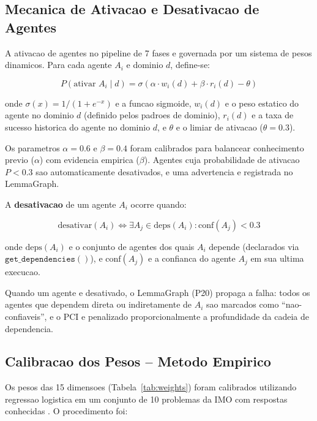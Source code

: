 \documentclass[5p]{elsarticle}
\begin{document}
\subsection{Mecanica de Ativacao e Desativacao de Agentes}

A ativacao de agentes no pipeline de 7 fases e governada por um sistema de
pesos dinamicos. Para cada agente $A_i$ e dominio $d$, define-se:

\begin{equation}\label{eq:activation}
 P(\text{ativar } A_i \mid d) = \sigma\left(\alpha \cdot w_i(d) + \beta \cdot r_i(d) - \theta\right)
\end{equation}

onde $\sigma(x)=1/(1+e^{-x})$ e a funcao sigmoide, $w_i(d)$ e o peso estatico
do agente no dominio $d$ (definido pelos padroes de dominio), $r_i(d)$ e a
taxa de sucesso historica do agente no dominio $d$, e $\theta$ e o limiar de
ativacao ($\theta=0.3$).

Os parametros $\alpha=0.6$ e $\beta=0.4$ foram calibrados para balancear
conhecimento previo ($\alpha$) com evidencia empirica ($\beta$). Agentes cuja
probabilidade de ativacao $P<0.3$ sao automaticamente desativados, e uma
advertencia e registrada no LemmaGraph.

A \textbf{desativacao} de um agente $A_i$ ocorre quando:

\begin{equation}\label{eq:deactivation}
 \text{desativar}(A_i) \iff \exists A_j \in \text{deps}(A_i) : \text{conf}(A_j) < 0.3
\end{equation}

onde $\text{deps}(A_i)$ e o conjunto de agentes dos quais $A_i$ depende
(declarados via $\texttt{get\_dependencies}()$), e $\text{conf}(A_j)$ e a
confianca do agente $A_j$ em sua ultima execucao.

Quando um agente e desativado, o LemmaGraph (P20) propaga a falha: todos os
agentes que dependem direta ou indiretamente de $A_i$ sao marcados como
``nao-confiaveis'', e o PCI e penalizado proporcionalmente a profundidade
da cadeia de dependencia.

\subsection{Calibracao dos Pesos -- Metodo Empirico}

Os pesos das 15 dimensoes (Tabela~\ref{tab:weights}) foram calibrados utilizando
regressao logistica em um conjunto de 10 problemas da IMO com respostas
conhecidas \cite{cohen1988}. O procedimento foi:
\end{document}
